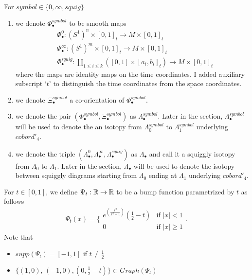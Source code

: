 \begin{definition}
For $symbol\in\{0,\infty, squig \}$
\begin{enumerate}
\item we denote $\Phi_\bullet^{symbol}$ to be smooth maps
\begin{align*}
&\Phi_\bullet^0 : (S^1)^n \times [0,1]_t \rightarrow M \times [0,1]_t \\
&\Phi_\bullet^\infty : (S^1)^m \times [0,1]_t \rightarrow M \times [0,1]_t \\
&\Phi_\bullet^{squig} : \coprod_{1\leq i \leq k} ([0,1] \times [a_i,b_i]_t) \rightarrow M \times [0,1]_t
\end{align*}
where the maps are identity maps on the time coordinates. I added auxiliary subscript `$t$' to distinguish the time coordinates from the space coordinates.

\item we denote $\Xi_\bullet^{symbol}$ a co-orientation of $\Phi_\bullet^{symbol}$.

\item we denote the pair $(\Phi_\bullet^{symbol},\Xi_\bullet^{symbol})$ as $\Lambda_\bullet^{symbol}$. Later in the section, $\Lambda_\bullet^{symbol}$ will be used to denote the an isotopy from $\Lambda_0^{symbol}$ to $\Lambda_1^{symbol}$ underlying $cobord'_4$.

\item we denote the triple $(\Lambda_\bullet^{0},\Lambda_\bullet^{\infty},\Lambda_\bullet^{squig})$ as $\Lambda_\bullet$ and call it a squiggly isotopy from $\Lambda_0$ to $\Lambda_1$. Later in the section, $\Lambda_\bullet$ will be used to denote the isotopy between squiggly diagrams starting from $\Lambda_0$ ending at $\Lambda_1$ underlying $cobord'_4$.
\end{enumerate}
\end{definition}

\begin{definition}
For $t \in [0,1]$, we define $\Psi_t: \mathbb{R} \rightarrow \mathbb{R}$ to be a bump function parametrized by $t$ as follows
\[\Psi_t(x)=\bigg\{
\begin{array}{ll}
    e^{(\frac{x^2}{x^2 - 1})}(\frac{1}{2}-t) & \text{if } |x| < 1 \\
    0 & \text{if } |x| \geq 1
\end{array}
\bigg.
\]
Note that 
\begin{itemize}
\item $supp(\Psi_t) = [-1,1]$ if $t\neq \frac{1}{2}$

\item $\{(1,0)$, $(-1,0),(0, \frac{1}{2}-t)\} \subset Graph(\Psi_t)$
\end{itemize}
\end{definition}


